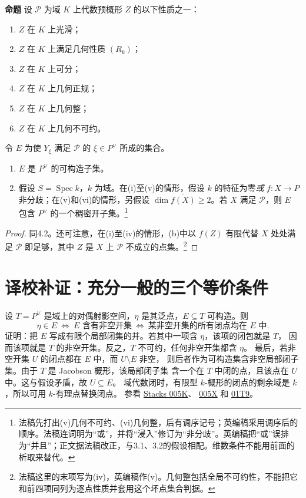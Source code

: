 \documentclass[openany,fontset=fandol]{ctexbook}
\DeclareMathOperator{\Spec}{Spec}
\newcommand{\calP}{\mathcal P}
\newcommand{\tagitem}[2]{\par\medskip\noindent\textbf{#1\quad #2}\enspace}
\begin{document}
\tagitem{命题}{4.3}
设 $\calP$ 为域 $K$ 上代数预概形 $Z$ 的以下性质之一：
\begin{enumerate}[label=(\roman*),nosep]
\item $Z$ 在 $K$ 上光滑；
\item $Z$ 在 $K$ 上满足几何性质 $(R_k)$；
\item $Z$ 在 $K$ 上可分；
\item $Z$ 在 $K$ 上几何正规；
\item $Z$ 在 $K$ 上几何整；
\item $Z$ 在 $K$ 上几何不可约。
\end{enumerate}
令 $E$ 为使 $Y_\xi$ 满足 $\calP$ 的 $\xi\in P^\vee$ 所成的集合。
\begin{enumerate}[label=(\alph*),nosep]
\item $E$ 是 $P^\vee$ 的可构造子集。
\item 假设 $S=\Spec k$，$k$ 为域。在(i)至(v)的情形，假设 $k$ 的特征为零\emph{或} $f:X\to P$ 非分歧；在(v)和(vi)的情形，另假设 $\dim\overline{f(X)}\geq2$。若 $X$ 满足 $\calP$，则 $E$ 包含 $P^\vee$ 的一个稠密开子集。\footnote{法稿先打出(v)几何不可约、(vi)几何整，后有调序记号；英编稿采用调序后的顺序。法稿连词明为“或”，并将“浸入”修订为“非分歧”。英编稿把“或”误排为“并且”；正文据法稿改正，与3.1、3.2的假设相配。维数条件不能用前面的析取来替代。}
\end{enumerate}
\begin{proof}
同4.2。还可注意，在(i)至(iv)的情形，(b)中以 $f(Z)$ 有限代替 $X$ 处处满足 $\calP$ 即足够，其中 $Z$ 是 $X$ 上 $\calP$ 不成立的点集。\footnote{法稿这里的末项写为(iv)，英编稿作(v)。几何整包括全局不可约性，不能把它和前四项同列为逐点性质并套用这个坏点集合判据。}
\end{proof}

\section*{译校补证：充分一般的三个等价条件}
设 $T=P^\vee$ 是域上的对偶射影空间，$\eta$ 是其泛点，$E\subseteq T$ 可构造。则
\[
\eta\in E
\ \Longleftrightarrow\
\text{$E$ 含有非空开集}
\ \Longleftrightarrow\
\text{某非空开集的所有闭点均在 $E$ 中}.
\]
证明：把 $E$ 写成有限个局部闭集的并。若其中一项含 $\eta$，该项的闭包就是 $T$，
因而该项就是 $T$ 的非空开集。反之，$T$ 不可约，任何非空开集都含 $\eta$。
最后，若非空开集 $U$ 的闭点都在 $E$ 中，而 $U\setminus E$ 非空，
则后者作为可构造集含非空局部闭子集。由于 $T$ 是 Jacobson 概形，该局部闭子集
含一个在 $T$ 中闭的点，且该点在 $U$ 中。这与假设矛盾，故 $U\subseteq E$。
域代数闭时，有限型 $k$-概形的闭点的剩余域是 $k$，所以可用 $k$-有理点替换闭点。
参看 \href{https://stacks.math.columbia.edu/tag/005K}{Stacks 005K}、
\href{https://stacks.math.columbia.edu/tag/005X}{005X} 和
\href{https://stacks.math.columbia.edu/tag/01T9}{01T9}。
\end{document}
